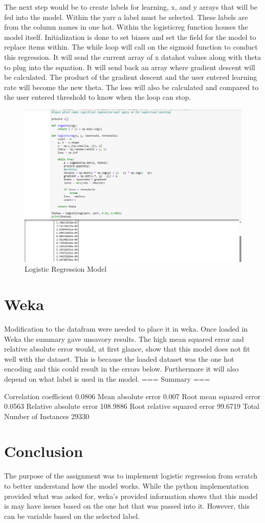 \documentclass{article}
\begin{document}
The next step would be to create labels for learning, x, and y arrays that will be fed into the model. Within the yarr a label must be selected. These labels are from the column names in one hot. Within the logisticreg function houses the model itself. Initialization is done to set biases and set the field for the model to replace items within. The while loop will call on the sigmoid function to conduct this regression. It will send the current array of x datahot values along with theta to plug into the equation. It will send back an array where gradient descent will be calculated. The product of the gradient descent and the user entered learning rate will become the new theta. The loss will also be calculated and compared to the user entered threshold to know when the loop can stop.
\begin{figure}
    \centering
    \includegraphics[width=0.5\linewidth]{c.png}
    \caption{Logistic Regression Model}
    \label{fig:enter-label}
\end{figure}

\section{Weka}
Modification to the datafram were needed to place it in weka. Once loaded in Weka the summary gave unsavory results. The high mean squared error and relative absolute error would, at first glance, show that this model does not fit well with the dataset. This is because the loaded dataset was the one hot encoding and this could result in the errors below. Furthermore it will also depend on what label is used in the model. 
=== Summary ===

Correlation coefficient                  0.0806
Mean absolute error                      0.007 
Root mean squared error                  0.0563
Relative absolute error                108.9886 %
Root relative squared error             99.6719 %
Total Number of Instances            29330    
\section{Conclusion}
The purpose of the assignment was to implement logistic regression from scratch to better understand how the model works. While the python implementation provided what was asked for, weka's provided information shows that this model is may have issues based on the one hot that was passed into it. However, this can be variable based on the selected label.
\end{document}
